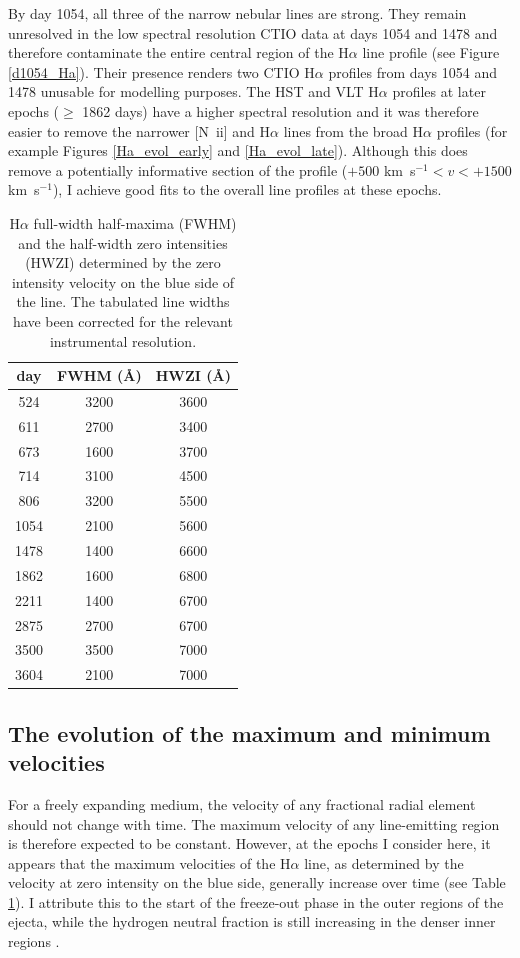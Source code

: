 By day 1054, all three of the narrow nebular lines are strong.  They 
remain unresolved in the low spectral resolution CTIO data at days 1054 
and 1478 and therefore contaminate the entire central region of the 
H$\alpha$ line profile (see Figure \ref{d1054_Ha}).  Their presence renders two CTIO H$\alpha$ 
profiles from days 1054 and 1478 unusable for modelling purposes.  The HST 
and VLT H$\alpha$ profiles at later epochs ($\ge$ 1862 days) have a higher 
spectral resolution and it was therefore easier to remove the narrower 
[N~{\sc ii}] and H$\alpha$ lines from the broad H$\alpha$ profiles (for 
example Figures \ref{Ha_evol_early} and \ref{Ha_evol_late}). Although this 
does remove a potentially informative section of the profile ($+500$ 
km~s$^{-1}<v<+1500$ km~s$^{-1}$), I achieve good fits to the overall line 
profiles at these epochs.

\begin{table}
\centering
\caption{H$\alpha$ full-width half-maxima (FWHM) and the half-width zero 
intensities (HWZI) determined by the zero intensity velocity on the 
blue side of the line.  The tabulated line widths have been corrected for the relevant instrumental resolution.}
\begin{tabular}{c cc}
day & FWHM (\AA) & HWZI (\AA) \\
\hline
524 & 3200 & 3600 \\
611 & 2700 & 3400 \\
673 & 1600 & 3700 \\
714 & 3100 & 4500 \\
806 & 3200 & 5500 \\
1054 & 2100 & 5600 \\
1478 & 1400 & 6600 \\
1862 & 1600 & 6800 \\
2211 & 1400 & 6700 \\
2875 & 2700 & 6700 \\
3500 & 3500 & 7000 \\
3604 & 2100 & 7000

\end{tabular}

\label{FWHM}
\end{table}%

\subsection{The evolution of the maximum and minimum velocities}

For a freely expanding medium, the velocity of any fractional radial 
element should not change with time.  The maximum velocity of any 
line-emitting region is therefore expected to be constant.  However, at 
the epochs I consider here, it appears that the maximum velocities of the 
H$\alpha$ line, as determined by the velocity at zero intensity on the 
blue side, generally increase over time (see Table \ref{FWHM}).  I 
attribute this to the start of the freeze-out phase in the outer regions 
of the ejecta, while the hydrogen neutral fraction is still increasing in 
the denser inner regions \citep{Danziger1991,Fransson1993}.


